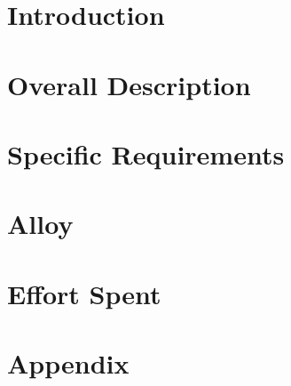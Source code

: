 \documentclass[a4paper,12pt]{report}
\begin{document}
\setcounter{tocdepth}{1}
{\tableofcontents}

\chapter{Introduction}

\clearpage

\chapter{Overall Description}

\clearpage

\chapter{Specific Requirements}\label{ch:section3}

\clearpage

\chapter{Alloy}

\clearpage

\chapter{Effort Spent}

\clearpage

\appendix
\chapter{Appendix}



\end{document}
